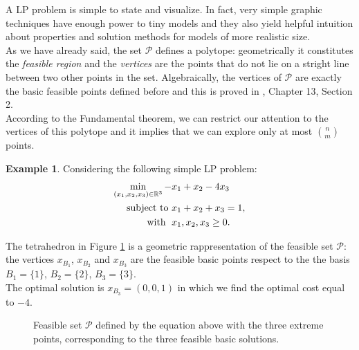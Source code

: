 \documentclass[a4paper,10 pt,titlepage,twoside]{report}
\theoremstyle{plain}
\theoremstyle{definition}
\newtheorem{ex}[thm]{Example}
\theoremstyle{remark}
\begin{document}
A LP problem is simple to state and visualize. In fact, very simple graphic techniques have enough power to tiny models and they also yield helpful intuition about properties and solution methods for models of more realistic size.\\ As we have already said, the set $\mathcal{P}$ defines a polytope: geometrically it constitutes the \textit{feasible region} and the \textit{vertices} are the points that do not lie on a stright line between two other points in the set. Algebraically, the vertices of $\mathcal{P}$ are exactly the basic feasible points defined before and this is proved in \cite{W}, Chapter 13, Section 2.\\ According to the Fundamental theorem, we can restrict our attention to the vertices of this polytope and it implies that we can explore only at most  ${n}\choose{m}$ points.
\begin{ex}\label{LPexample}
Considering the following simple LP problem:
\begin{align*}
\min\limits_{(x_{1},x_{2},x_{3})\in\mathbb{R}^{3}} -&x_{1}+ x_{2}-4x_{3}\\
\text{subject to    }&x_{1}+x_{2}+x_{3}=1,\\
 \text{\; with   \;} &x_{1}, x_{2}, x_{3} \geq 0.
\end{align*}
\end{ex}
The tetrahedron in Figure \ref{tetra} is a geometric rappresentation of the feasible set $\mathcal{P}$: the vertices ${x}_{B_{1}}$, ${x}_{B_{2}}$ and ${x}_{B_{3}}$ are the feasible basic points respect to the the basis $B_{1} =\{1\}$,  $B_{2} =\{2\}$,  $B_{3} =\{3\}$.\\ The optimal solution is ${x}_{B_{3}}=(0,0,1)$ in which we find the optimal cost equal to $-4$.\\
\begin{figure}[h]\caption{\label{tetra}Feasible set $\mathcal{P}$ defined by the equation above with the three extreme points, corresponding to the three feasible basic solutions.} 
\begin{center}
\end{center}
\end{figure}
\end{document}
